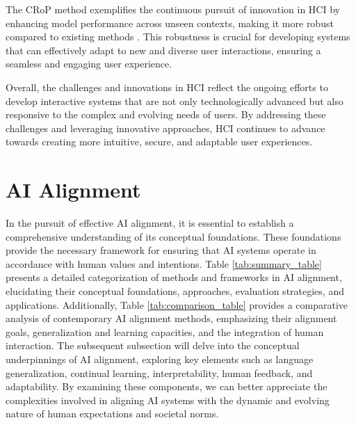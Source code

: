 The CRoP method exemplifies the continuous pursuit of innovation in HCI by enhancing model performance across unseen contexts, making it more robust compared to existing methods \cite{kaur2024cropcontextwiserobuststatic}. This robustness is crucial for developing systems that can effectively adapt to new and diverse user interactions, ensuring a seamless and engaging user experience.



Overall, the challenges and innovations in HCI reflect the ongoing efforts to develop interactive systems that are not only technologically advanced but also responsive to the complex and evolving needs of users. By addressing these challenges and leveraging innovative approaches, HCI continues to advance towards creating more intuitive, secure, and adaptable user experiences.













\section{AI Alignment} \label{sec:AI Alignment}



In the pursuit of effective AI alignment, it is essential to establish a comprehensive understanding of its conceptual foundations. These foundations provide the necessary framework for ensuring that AI systems operate in accordance with human values and intentions. Table \ref{tab:summary_table} presents a detailed categorization of methods and frameworks in AI alignment, elucidating their conceptual foundations, approaches, evaluation strategies, and applications. Additionally, Table \ref{tab:comparison_table} provides a comparative analysis of contemporary AI alignment methods, emphasizing their alignment goals, generalization and learning capacities, and the integration of human interaction. The subsequent subsection will delve into the conceptual underpinnings of AI alignment, exploring key elements such as language generalization, continual learning, interpretability, human feedback, and adaptability. By examining these components, we can better appreciate the complexities involved in aligning AI systems with the dynamic and evolving nature of human expectations and societal norms.









